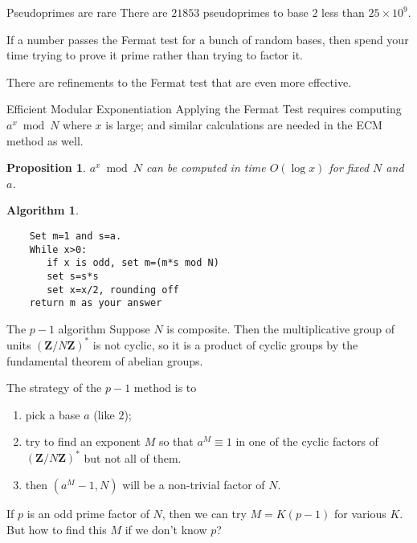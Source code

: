 \documentclass{beamer}
\newtheorem{proposition}{Proposition}
\newtheorem{algorithm}{Algorithm}
\begin{document}
\begin{frame}{Pseudoprimes are rare}
	There are $21853$ pseudoprimes to base $2$ less than $25\times 10^{9}$.

	\bigskip\noindent
	If a number passes the Fermat test for a bunch of random bases, then spend your time trying to prove it prime
	rather than trying to factor it.

	\bigskip\noindent
	There are refinements to the Fermat test that are even more effective.

\end{frame}
\begin{frame}[fragile]{Efficient Modular Exponentiation}
	Applying the Fermat Test requires computing $a^x\bmod{N}$ where $x$ is
	large; and similar calculations are needed in the ECM method as well.

	\begin{proposition} $a^x\bmod{N}$ can be computed in time $O(\log x)$ for fixed $N$ and $a$. 
	\end{proposition}
	\begin{algorithm}
	\begin{verbatim}
	Set m=1 and s=a.
	While x>0:
	   if x is odd, set m=(m*s mod N)
	   set s=s*s
	   set x=x/2, rounding off
	return m as your answer
	\end{verbatim}
\end{algorithm}
\end{frame}
\begin{frame}{The $p-1$ algorithm}
	Suppose $N$ is composite.   Then the multiplicative group of units $(\mathbf{Z}/N\mathbf{Z})^*$ is not cyclic, so it is a product of cyclic 
	groups by the fundamental theorem of abelian groups. 

	\bigskip\noindent
	The strategy of the $p-1$ method is to
	\begin{enumerate}
		\item pick a base $a$ (like $2$);
		\item try to find an exponent $M$ so that $a^{M}\equiv 1$ in one of the cyclic factors of $(\mathbf{Z}/N\mathbf{Z})^*$ but not all of them. 
		\item then $(a^{M}-1,N)$ will be a non-trivial factor of $N$.
	\end{enumerate}	

	\bigskip\noindent
	If $p$ is an odd prime factor of $N$, then we can try $M=K(p-1)$ for various $K$.  But how to find this $M$ if we don't know $p$?

\end{frame}
\end{document}
